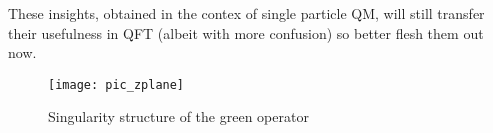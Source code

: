 \documentclass[11pt]{article}
\theoremstyle{definition}
\begin{document}
These insights, obtained in the contex of single particle QM, will still transfer their usefulness in QFT (albeit with more confusion) so better flesh them out now.
\begin{figure}
  \texttt{[image: pic\_zplane]}
  \caption{Singularity structure of the green operator}
  \label{fig:boat1}
\end{figure}
\end{document}
